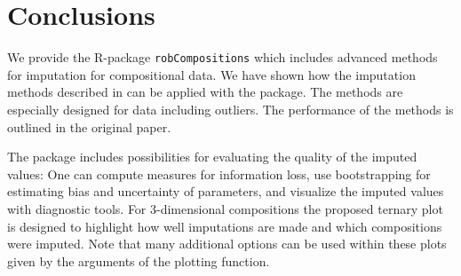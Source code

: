 \documentclass{scrartcl}\usepackage[]{graphicx}\usepackage[]{color}
\begin{document}
\section{Conclusions}

We provide the R-package \texttt{robCompositions} which includes advanced methods for 
imputation for compositional data. We have shown how the imputation
methods described in \cite{Hron09} can be applied with the package.
The methods are especially designed for data including outliers.
The performance of the methods is outlined in the original paper.

The package includes possibilities for evaluating the quality of
the imputed values: One can compute measures for information loss,
use bootstrapping for estimating bias and uncertainty of parameters,
and visualize the imputed values with diagnostic tools.
For 3-dimensional compositions the proposed ternary plot is designed 
to highlight how well imputations are made and which compositions were imputed.
Note that many additional options
can be used within these plots given by the arguments of the 
plotting function.

{}

\end{document}
